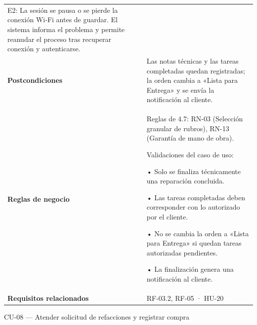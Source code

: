 {\begin{longtable}[]{@{}
  >{\raggedright\arraybackslash}p{}
  >{\raggedright\arraybackslash}p{}@{}}
E2: La sesión se pausa o se pierde la conexión Wi‑Fi antes de guardar.
El sistema informa el problema y permite reanudar el proceso tras
recuperar conexión y autenticarse. \\
\textbf{Postcondiciones} & Las notas técnicas y las tareas completadas
quedan registradas; la orden cambia a «Lista para Entrega» y se envía la
notificación al cliente. \\
\textbf{Reglas de negocio} & Reglas de 4.7: RN-03 (Selección granular de
rubros), RN-13 (Garantía de mano de obra).

Validaciones del caso de uso:

• Solo se finaliza técnicamente una reparación concluida.

• Las tareas completadas deben corresponder con lo autorizado por el
cliente.

• No se cambia la orden a «Lista para Entrega» si quedan tareas
autorizadas pendientes.

• La finalización genera una notificación al cliente. \\
\textbf{Requisitos relacionados} & RF-03.2, RF-05 · HU-20 \\
\end{longtable}
}

CU-08 --- Atender solicitud de refacciones y registrar compra

